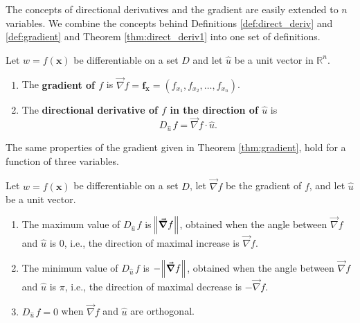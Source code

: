 The concepts of directional derivatives and the gradient are easily extended to $n$ variables. We combine the concepts behind Definitions \ref{def:direct_deriv} and \ref{def:gradient} and Theorem \ref{thm:direct_deriv1} into one set of definitions.


\begin{definition}\label{def:direct_deriv3}

Let $w=f(\mathbf{x})$ be differentiable on a set $D$ and let $\hat u $ be a unit vector in $\mathbb{R}^n$.
\begin{enumerate}
	\item	The \textbf{gradient of $f$} is $\vec{\nabla} f = \mathbf{f_x}=\left( f_{x_1},f_{x_2},\ldots,f_{x_n}\right)$.
	\item The \textbf{directional derivative of $f$ in the direction of $\hat u$} is $$D_{\hat u\,}f=\vec{\nabla} f\cdot \hat u.$$
\end{enumerate}

\end{definition}

The same properties of the gradient given in Theorem \ref{thm:gradient}, hold for a function of three variables.

\begin{theorem}\label{thm:gradient3}

Let $w=f(\mathbf{x})$ be differentiable on a set $D$, let $\vec{\nabla} f$ be the gradient of $f$, and let $\hat u$ be a unit vector.
\begin{enumerate}
	\item The maximum value of $D_{\hat u\,}f$ is $\norm{\vec{\nabla} f}$, obtained when the angle between $\vec{\nabla} f$ and $\hat u$ is 0, i.e.,  the direction of maximal increase is $\vec{\nabla} f$.
	\item The minimum value of $D_{\hat u\,}f$ is $-\norm{\vec{\nabla} f}$, obtained when the angle between $\vec{\nabla} f$ and $\hat u$ is $\pi$, i.e., the direction of maximal decrease is $-\vec{\nabla} f$.
	\item $D_{\hat u\,}f = 0$ when $\vec{\nabla} f$ and $\hat u$ are orthogonal.
\end{enumerate}

\end{theorem}

